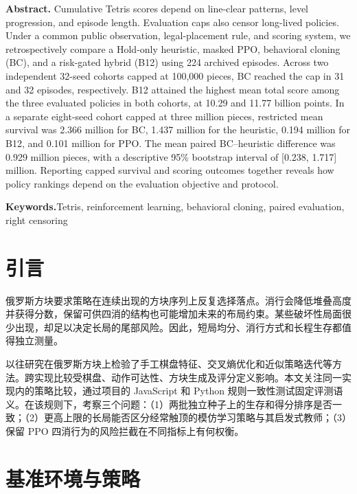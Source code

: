 \documentclass[UTF8,fontset=none,zihao=-4,a4paper]{ctexart}
\newcommand{\1}{\mathbf{1}}
\begin{document}
\medskip
{\small
\noindent\textbf{Abstract.}\enspace
Cumulative Tetris scores depend on line-clear patterns, level progression, and episode length. Evaluation caps also censor long-lived policies. Under a common public observation, legal-placement rule, and scoring system, we retrospectively compare a Hold-only heuristic, masked PPO, behavioral cloning (BC), and a risk-gated hybrid (B12) using 224 archived episodes. Across two independent 32-seed cohorts capped at 100,000 pieces, BC reached the cap in 31 and 32 episodes, respectively. B12 attained the highest mean total score among the three evaluated policies in both cohorts, at 10.29 and 11.77 billion points. In a separate eight-seed cohort capped at three million pieces, restricted mean survival was 2.366 million for BC, 1.437 million for the heuristic, 0.194 million for B12, and 0.101 million for PPO. The mean paired BC--heuristic difference was 0.929 million pieces, with a descriptive 95\% bootstrap interval of [0.238, 1.717] million. Reporting capped survival and scoring outcomes together reveals how policy rankings depend on the evaluation objective and protocol.
\par\smallskip
\noindent\textbf{Keywords.}\enspace Tetris, reinforcement learning, behavioral cloning, paired evaluation, right censoring\par}

\section{引言}

俄罗斯方块要求策略在连续出现的方块序列上反复选择落点。消行会降低堆叠高度并获得分数，保留可供四消的结构也可能增加未来的布局约束。某些破坏性局面很少出现，却足以决定长局的尾部风险。因此，短局均分、消行方式和长程生存都值得独立测量。

以往研究在俄罗斯方块上检验了手工棋盘特征、交叉熵优化和近似策略迭代等方法\cite{thiery2009,gabillon2013}。跨实现比较受棋盘、动作可达性、方块生成及评分定义影响。本文关注同一实现内的策略比较，通过项目的 JavaScript 和 Python 规则一致性测试固定评测语义\cite{rules}。在该规则下，考察三个问题：（1）两批独立种子上的生存和得分排序是否一致；（2）更高上限的长局能否区分经常触顶的模仿学习策略与其启发式教师；（3）保留 PPO 四消行为的风险拦截在不同指标上有何权衡。

\section{基准环境与策略}
\end{document}
